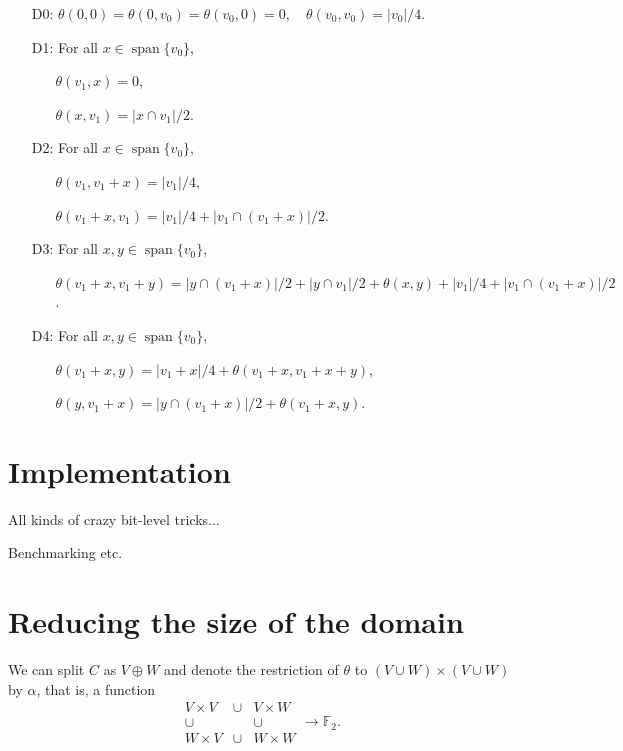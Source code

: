 \documentclass[a4paper,debug]{tufte-handout}
\theoremstyle{plain}
\theoremstyle{definition}
\theoremstyle{remark}
\DeclareMathOperator{\Span}{span}
\newcommand{\F}{\mathbb{F}}
\begin{document}
\begin{itemize}

	\item[D0:] $\theta(0,0) = \theta(0,v_0) = \theta(v_0,0) = 0, \quad \theta(v_0,v_0) = |v_0|/4$.

	\item[D1:] For all $x \in \Span\{v_0\}$, 
	\begin{itemize}
		\item[] $\theta(v_1,x) = 0$, 
		\item[] $\theta(x,v_1) = |x\cap v_1|/2$.
	\end{itemize}

	\item[D2:] For all $x \in \Span\{v_0\}$,
	\begin{itemize}
	 	\item[] $\theta(v_1,v_1+x) = |v_1|/4$,
	 	\item[] $\theta(v_1 + x,v_1) = |v_1|/4 + |v_1\cap(v_1+x)|/2$.
	 \end{itemize} 
	 \item[D3:] For all $x,y\in \Span\{v_0\}$,
	 \begin{itemize}
	 	\item[] $\theta(v_1+x,v_1+y) = |y\cap(v_1+x)|/2 + |y\cap v_1|/2 + \theta(x,y) + |v_1|/4 + |v_1\cap(v_1+x)|/2$.
	 \end{itemize}
	 \item[D4:] For all $x,y\in \Span\{v_0\}$,
	 \begin{itemize}
	 	\item[] $\theta(v_1+x,y) = |v_1+x|/4 + \theta(v_1+x,v_1+x+y)$,
	 	\item[] $\theta(y,v_1+x) = |y\cap(v_1+x)|/2 + \theta(v_1+x,y)$.
	 \end{itemize}

\end{itemize} 

\section{Implementation}

All kinds of crazy bit-level tricks...

Benchmarking etc.

\section{Reducing the size of the domain} 
We can split $C$ as $V\oplus W$ and denote the restriction of $\theta$ to $(V\cup W)\times (V \cup W)$ by $\alpha$, that is, a function
\[
	\begin{array}{ccc}
		V\times V& \cup&V\times W\\
		\cup&&\cup\\
		W\times V&\cup &W\times W
	\end{array} \longrightarrow \F_2.
\]
\end{document}
